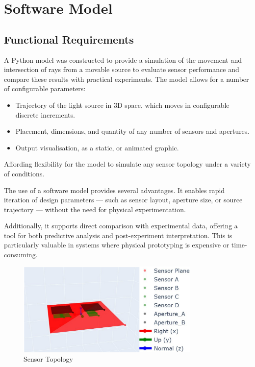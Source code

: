 \section{Software Model}
\label{sec:softwareModel}

\subsection{Functional Requirements}

A Python model was constructed to provide a simulation of the movement and intersection of rays from a movable source to evaluate sensor performance and compare these results with practical experiments.
The model allows for a number of configurable parameters:
\begin{itemize}
    \item Trajectory of the light source in 3D space, which moves in configurable discrete increments.
    \item Placement, dimensions, and quantity of any number of sensors and apertures.
    \item Output visualisation, as a static, or animated graphic.
\end{itemize}
Affording flexibility for the model to simulate any sensor topology under a variety of conditions.

The use of a software model provides several advantages. It enables rapid iteration of design parameters — such as sensor layout, aperture size, or source trajectory — without the need for physical experimentation. 
 
Additionally, it supports direct comparison with experimental data, offering a tool for both predictive analysis and post-experiment interpretation. 
This is particularly valuable in systems where physical prototyping is expensive or time-consuming.

\begin{figure}[htbp] %
    \centering
    \includegraphics[width=0.8\textwidth]{chapters/methodology/SoftwareModel/images/Sensor plane.png} %
    \caption{Sensor Topology}       %
    \label{fig:Sensor Topology}            %
\end{figure}                             %






